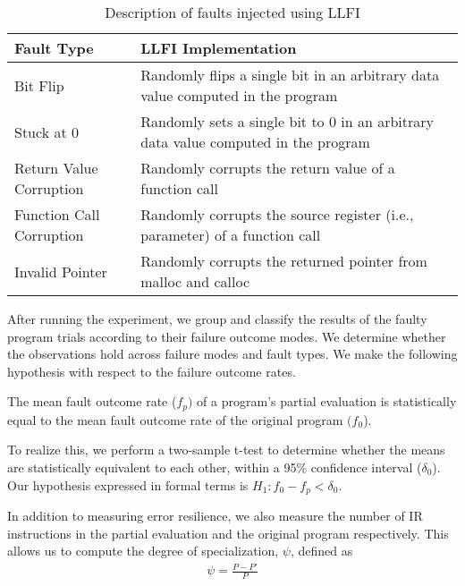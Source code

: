 \begin{table}[htbp]
\small{
\begin{center}
    \begin{tabular}{|p{3cm}|p{5cm}|}
    \hline
    \textbf{Fault Type} & \textbf{LLFI Implementation} \\ \hline
    Bit Flip & Randomly flips a single bit in an arbitrary data value computed in the program  \\ \hline
    Stuck at 0 & Randomly sets a single bit to 0 in an arbitrary data value computed in the program  \\ \hline
    Return Value Corruption & Randomly corrupts the return value of a function call \\ \hline
    Function Call Corruption & Randomly corrupts the source register (i.e., parameter) of a function call \\ \hline
    Invalid Pointer & Randomly corrupts the returned pointer from malloc and calloc\\ \hline
    \hline
    \end{tabular}
    \end{center}
    }
    \caption{Description of faults injected using LLFI}
    \label{tab:faulttypes}
\end{table}
 

After running the experiment, we group and classify the results of the faulty program trials according to their failure outcome modes.
We determine whether the observations hold across failure modes and fault types. 
We make the following hypothesis with respect to the failure outcome rates.

\begin{hyp}
  \label{hyp:hypothesis}
The mean fault outcome rate ($f_p)$ of a program's partial evaluation is statistically equal to the mean fault outcome rate of the original program $(f_0$).
\end{hyp}

To realize this, we perform a two-sample t-test to determine whether the means are statistically equivalent to each other, within a 95\% confidence interval ($\delta_0$).
Our hypothesis expressed in formal terms is $H_1: f_0 - f_p < \delta_0 $.

In addition to measuring error resilience, we also measure the number of IR instructions in the partial evaluation and the original program respectively.
This allows us to compute the degree of specialization, $\psi$, defined as
\begin{align*}
\psi = \frac{P - P'}{P}
\end{align*}

